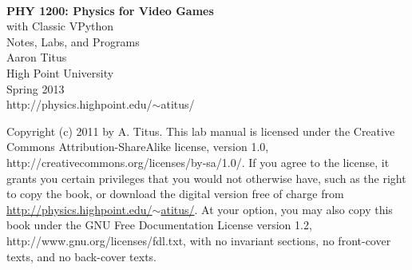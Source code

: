 \documentclass[10pt]{tituslab}
\begin{document}
\myeqnspacing %
\frontmatter
\yesiwantarabic
\frontmatter
\thispagestyle{empty}
\noindent\vspace{0mm}\\
\noindent\vspace{10mm}\hspace{6mm}\textsf{\textbf{\Huge{PHY 1200: Physics for Video Games}}}\\
\noindent\vspace{4mm}\hspace{4in}\textsf{\Large{with Classic VPython}}\\
\noindent\vspace{4mm}\hspace{4in}\textsf{\Large{Notes, Labs, and Programs}}\\
\noindent\vspace{4mm}\hspace{4in}\textsf{\Large{Aaron Titus}}\\
\noindent\vspace{4mm}\hspace{4in}\textsf{\Large{High Point University}}\\
\noindent\vspace{4mm}\hspace{4in}\textsf{Spring 2013}\\
\noindent\vspace{4mm}\hspace{4in}\textsf{http://physics.highpoint.edu/$\sim$atitus/}
\yesiwantarabic
\mynormaltype

\pagebreak[4]
\noindent
Copyright (c) 2011 by A. Titus. This lab manual is
    licensed under the Creative Commons
    Attribution-ShareAlike license, version 1.0, 
    http://creativecommons.org/licenses/by-sa/1.0/.
    If you agree to the license, it grants you certain privileges that
    you would not otherwise have, such as the right to copy the book,
    or download the digital version free of charge from
    \href{http://physics.highpoint.edu/~atitus/}{http://physics.highpoint.edu/$\sim$atitus/}. At your option, you may also copy this book
    under the GNU Free Documentation License version 1.2, http://www.gnu.org/licenses/fdl.txt,
    with no invariant sections, no front-cover texts, and no back-cover texts.


\tableofcontents
\mainmatter
\startchaptersonleftpage
\addtocounter{page}{4} 
\parafmt
\myeqnspacing %
\end{document}

